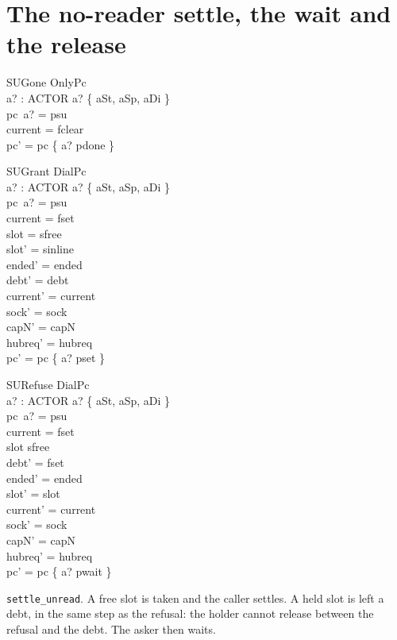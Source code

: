 \documentclass[a4paper,10pt,fleqn]{article}
\begin{document}
\section{The no-reader settle, the wait and the release}

\begin{schema}{SUGone}
  OnlyPc \\
  a? : ACTOR
\where
  a? \in \{ aSt, aSp, aDi \} \\
  pc~a? = psu \\
  current = fclear \\
  pc' = pc \oplus \{ a? \mapsto pdone \}
\end{schema}

\begin{schema}{SUGrant}
  DialPc \\
  a? : ACTOR
\where
  a? \in \{ aSt, aSp, aDi \} \\
  pc~a? = psu \\
  current = fset \\
  slot = sfree \\
  slot' = sinline \\
  ended' = ended \\
  debt' = debt \\
  current' = current \\
  sock' = sock \\
  capN' = capN \\
  hubreq' = hubreq \\
  pc' = pc \oplus \{ a? \mapsto pset \}
\end{schema}

\begin{schema}{SURefuse}
  DialPc \\
  a? : ACTOR
\where
  a? \in \{ aSt, aSp, aDi \} \\
  pc~a? = psu \\
  current = fset \\
  slot \neq sfree \\
  debt' = fset \\
  ended' = ended \\
  slot' = slot \\
  current' = current \\
  sock' = sock \\
  capN' = capN \\
  hubreq' = hubreq \\
  pc' = pc \oplus \{ a? \mapsto pwait \}
\end{schema}

\texttt{settle\_unread}.  A free slot is taken and the caller settles.  A held
slot is left a debt, in the same step as the refusal: the holder cannot release
between the refusal and the debt.  The asker then waits.
\end{document}
